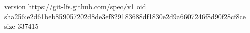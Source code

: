 version https://git-lfs.github.com/spec/v1
oid sha256:e2d61beb859057202d8de3ef829183688df1830e2d9a6607246f8d90f28cf8ce
size 337415
